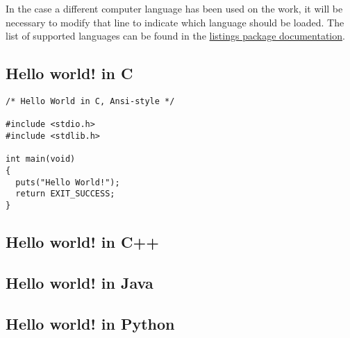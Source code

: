 %
%

In the case a different computer language has been used on the work, it will be necessary to modify that line to indicate which language should be loaded. The list of supported languages can be found in the \href{http://mirrors.ctan.org/macros/latex/contrib/listings/listings.pdf}{listings package documentation}.

\clearpage %
\subsection*{Hello world! in C}

\lstset{language=C}

\begin{scalefont}{.8} %
  \begin{lstlisting}
/* Hello World in C, Ansi-style */

#include <stdio.h>
#include <stdlib.h>

int main(void)
{
  puts("Hello World!");
  return EXIT_SUCCESS;
}
  \end{lstlisting}
\end{scalefont}


\subsection*{Hello world! in C++}

\lstset{language=C++}

\begin{scalefont}{.8} %
  
\end{scalefont}


\subsection*{Hello world! in Java}

\lstset{language=Java}

\begin{scalefont}{.8} %
  
\end{scalefont}


\subsection*{Hello world! in Python}

\lstset{language=python}

\begin{scalefont}{.8} %
  
\end{scalefont}


